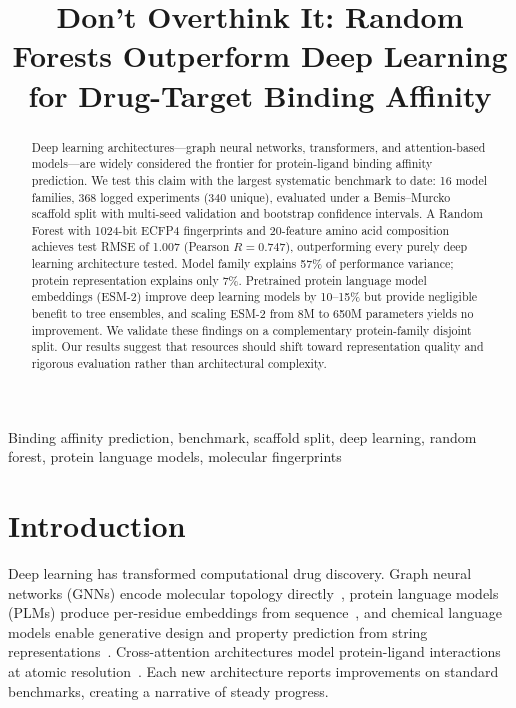 \documentclass[pmlr,twocolumn]{jmlr}
\title{Don't Overthink It: Random Forests Outperform Deep Learning for Drug-Target Binding Affinity}
\author{\phantom{Anonymous}}
\date{}
\begin{document}
\maketitle

\begin{abstract}
Deep learning architectures---graph neural networks, transformers, and attention-based models---are widely considered the frontier for protein-ligand binding affinity prediction. We test this claim with the largest systematic benchmark to date: 16 model families, 368 logged experiments (340 unique), evaluated under a Bemis--Murcko scaffold split with multi-seed validation and bootstrap confidence intervals. A Random Forest with 1024-bit ECFP4 fingerprints and 20-feature amino acid composition achieves test RMSE of 1.007 (Pearson $R = 0.747$), outperforming every purely deep learning architecture tested. Model family explains 57\% of performance variance; protein representation explains only 7\%. Pretrained protein language model embeddings (ESM-2) improve deep learning models by 10--15\% but provide negligible benefit to tree ensembles, and scaling ESM-2 from 8M to 650M parameters yields no improvement. We validate these findings on a complementary protein-family disjoint split. Our results suggest that resources should shift toward representation quality and rigorous evaluation rather than architectural complexity.
\end{abstract}

\begin{keywords}
Binding affinity prediction, benchmark, scaffold split, deep learning, random forest, protein language models, molecular fingerprints
\end{keywords}

\section{Introduction}

Deep learning has transformed computational drug discovery. Graph neural networks (GNNs) encode molecular topology directly~\citep{kipf2017gcn,gilmer2017mpnn}, protein language models (PLMs) produce per-residue embeddings from sequence~\citep{lin2023esm2}, and chemical language models enable generative design and property prediction from string representations~\citep{ozcelik2024s4,ozcelik2024hitchhiker}. Cross-attention architectures model protein-ligand interactions at atomic resolution~\citep{capla2023,cucco2026molxprot}. Each new architecture reports improvements on standard benchmarks, creating a narrative of steady progress.
\end{document}
